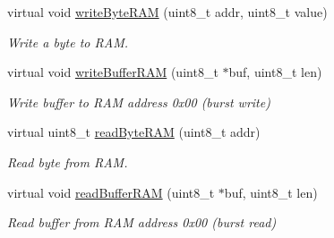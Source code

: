 \begin{DoxyCompactItemize}
virtual void \hyperlink{class_d_s1302_a326ccf7e4ac45d57d432ba9e5409e0a0}{write\+Byte\+R\+AM} (uint8\+\_\+t addr, uint8\+\_\+t value)
\begin{DoxyCompactList}\small\item\em Write a byte to R\+AM. \end{DoxyCompactList}\item 
virtual void \hyperlink{class_d_s1302_aef19576dfccf8c6bf976e3f7cce2f0a9}{write\+Buffer\+R\+AM} (uint8\+\_\+t $\ast$buf, uint8\+\_\+t len)
\begin{DoxyCompactList}\small\item\em Write buffer to R\+AM address 0x00 (burst write) \end{DoxyCompactList}\item 
virtual uint8\+\_\+t \hyperlink{class_d_s1302_adfd2a9c599d90e2c3484d6507831fce3}{read\+Byte\+R\+AM} (uint8\+\_\+t addr)
\begin{DoxyCompactList}\small\item\em Read byte from R\+AM. \end{DoxyCompactList}\item 
virtual void \hyperlink{class_d_s1302_a78b90f6f87fde5258d71fc0d56f7abc7}{read\+Buffer\+R\+AM} (uint8\+\_\+t $\ast$buf, uint8\+\_\+t len)
\begin{DoxyCompactList}\small\item\em Read buffer from R\+AM address 0x00 (burst read) \end{DoxyCompactList}\end{DoxyCompactItemize}
